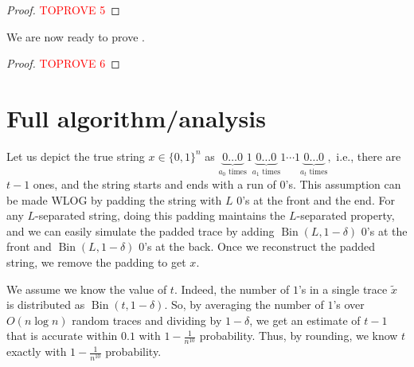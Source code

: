 \documentclass[12pt]{article}
\theoremstyle{definition}
\theoremstyle{remark}
\DeclareMathOperator{\Bin}{Bin}
\begin{document}
\begin{proof}\textcolor{red}{TOPROVE 5}\end{proof}

We are now ready to prove .

\begin{proof}\textcolor{red}{TOPROVE 6}\end{proof}

\iffalse
    \begin{figure}[!ht]
    \centering
    \resizebox{\textwidth}{!}{\begin{circuitikz}
    \tikzstyle{every node}=[font=\small]
    \draw (3,1) to[short] (9.75,1);
    \draw (3,0) to[short] (8.5,0);
    \draw [short] (8.5,0) -- (9.75,1);
    \draw [short] (8,0) -- (9.25,1);
    \draw [short] (7.0,0) -- (8.25,1);
    \draw [short] (4.25,0) -- (5.5,1);
    \draw [short] (4,0) -- (4.75,1);
    \node [font=\tiny] at (9.55,1.2) {$a_{m}$};
    \node [font=\tiny] at (8.3,-0.25) {$b_{m-k}$};
    \node [font=\tiny] at (8.75,1.2) {$a_{m-1}$};
    \node [font=\tiny] at (7.4,-0.25) {$b_{m-k-1}$};
    \node [font=\small] at (6.25,0.5) {$\mathbf{\cdots}$};
    \node [font=\tiny] at (5.15,1.2) {$a_{m-h}$};
    \node [font=\tiny] at (4.1,-0.25) {$b_{m-k-h}$};
    \node [font=\small] at (3.6,0.5) {$\mathbf{\cdots}$};
    \end{circuitikz}
    }\label{fig:my_label}
    \end{figure}
\fi


\section{Full algorithm/analysis} \label{sec:algorithm}

Let us depict the true string $x \in \{0, 1\}^n$ as $\underbrace{0 \dots 0}_{a_0 \text{ times}} 1 \underbrace{0 \dots 0}_{a_1 \text{ times}} 1 \cdots 1 \underbrace{0 \dots 0}_{a_t \text{ times}},$ i.e., there are $t-1$ ones, and the string starts and ends with a run of $0$'s. This assumption can be made WLOG by padding the string with $L$ $0$'s at the front and the end. For any $L$-separated string, doing this padding maintains the $L$-separated property, and we can easily simulate the padded trace by adding $\Bin(L, 1-\delta)$ $0$'s at the front and $\Bin(L, 1-\delta)$ $0$'s at the back. Once we reconstruct the padded string, we remove the padding to get $x$.


We assume we know the value of $t$. Indeed, the number of $1$'s in a single trace $\tilde{x}$ is distributed as $\Bin(t, 1-\delta)$. So, by averaging the number of $1$'s over $O(n \log n)$ random traces and dividing by $1-\delta$, we get an estimate of $t-1$ that is accurate within $0.1$ with $1-\frac{1}{n^{10}}$ probability. Thus, by rounding, we know $t$ exactly with $1-\frac{1}{n^{10}}$ probability.
\end{document}
